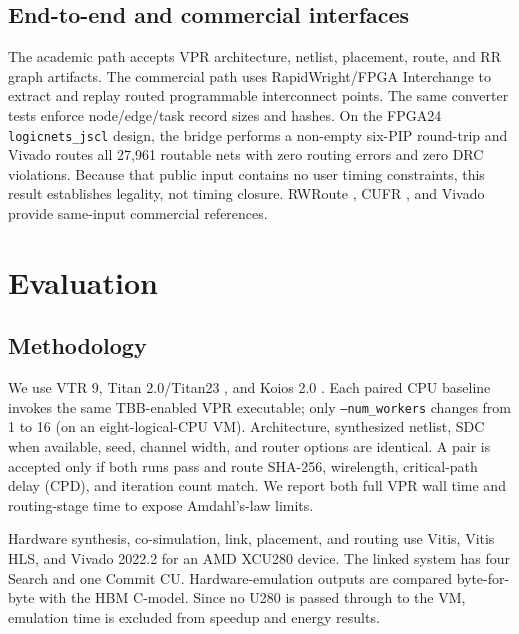 \documentclass[sigconf,anonymous,review]{acmart}
\begin{document}
\subsection{End-to-end and commercial interfaces}

The academic path accepts VPR architecture, netlist, placement, route, and RR
graph artifacts. The commercial path uses RapidWright/FPGA Interchange to
extract and replay routed programmable interconnect points. The same converter
tests enforce node/edge/task record sizes and hashes. On the FPGA24
\texttt{logicnets\_jscl} design, the bridge performs a non-empty six-PIP
round-trip and Vivado routes all 27,961 routable nets with zero routing errors
and zero DRC violations. Because that public input contains no user timing
constraints, this result establishes legality, not timing closure. RWRoute
\cite{zhou2021rwroute}, CUFR \cite{zang2024cufr}, and Vivado provide
same-input commercial references.

\section{Evaluation}

\subsection{Methodology}

We use VTR 9, Titan 2.0/Titan23 \cite{murray2013titan,talaei2023titan2}, and
Koios 2.0 \cite{arora2021koios}. Each paired CPU baseline invokes the same
TBB-enabled VPR executable; only \texttt{--num\_workers} changes from 1 to 16
(on an eight-logical-CPU VM). Architecture, synthesized netlist, SDC when
available, seed, channel width, and router options are identical. A pair is
accepted only if both runs pass and route SHA-256, wirelength, critical-path
delay (CPD), and iteration count match. We report both full VPR wall time and
routing-stage time to expose Amdahl's-law limits.

Hardware synthesis, co-simulation, link, placement, and routing use Vitis,
Vitis HLS, and Vivado 2022.2 for an AMD XCU280 device. The linked
system has four Search and one Commit CU. Hardware-emulation outputs are
compared byte-for-byte with the HBM C-model. Since no U280 is passed through to
the VM, emulation time is excluded from speedup and energy results.

\begin{table}[t]
\centering
\small

\caption{Deterministic paired VPR CPU baseline. ``Flow'' includes packing and
placement; ``Route'' isolates routing. Every pair has identical route hash,
wirelength, CPD, and routing-iteration count.}
\label{tab:cpu}
\end{table}
\end{document}
